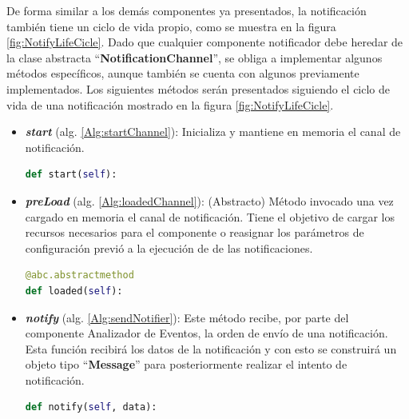         De forma similar a los demás componentes ya presentados, la notificación también tiene un ciclo de vida propio, como se muestra en la figura \ref{fig:NotifyLifeCicle}. Dado que cualquier componente notificador debe heredar de la clase abstracta ``\textbf{NotificationChannel}'', se obliga a implementar algunos métodos específicos, aunque también se cuenta con algunos previamente implementados. Los siguientes métodos serán presentados siguiendo el ciclo de vida de una notificación mostrado en la figura \ref{fig:NotifyLifeCicle}.
    
        \begin{itemize}
        
            \item \textbf{\textit{start}} (alg. \ref{Alg:startChannel}): 
            Inicializa y mantiene en memoria el canal de notificación.
            \begin{lstlisting}[language=Python, caption={Firma del método "\textit{start}" de la clase NotificationChannel.}, label=Alg:startChannel, numbers=none]
def start(self):
            \end{lstlisting}
            
            \item \textbf{\textit{preLoad}} (alg. \ref{Alg:loadedChannel}):
            (Abstracto) Método invocado una vez cargado en memoria el canal de notificación. Tiene el objetivo de cargar los recursos necesarios para el componente o reasignar los parámetros de configuración previó a la ejecución de de las notificaciones.
            \begin{lstlisting}[language=Python, caption={Firma del método "\textit{loaded}" de la clase NotificationChannel.}, label=Alg:loadedChannel, numbers=none]
@abc.abstractmethod
def loaded(self):
            \end{lstlisting}
        
            \item \textbf{\textit{notify}} (alg. \ref{Alg:sendNotifier}):
            Este método recibe, por parte del componente Analizador de Eventos, la orden de envío de una notificación. Esta función recibirá los datos de la notificación y con esto se construirá un objeto tipo ``\textbf{Message}'' para posteriormente realizar el intento de notificación.
            \begin{lstlisting}[language=Python, caption={Firma del método "\textit{notify}" de la clase NotificationChannel.}, label=Alg:sendNotifier, numbers=none]
def notify(self, data):
            \end{lstlisting}
            

\end{itemize}
